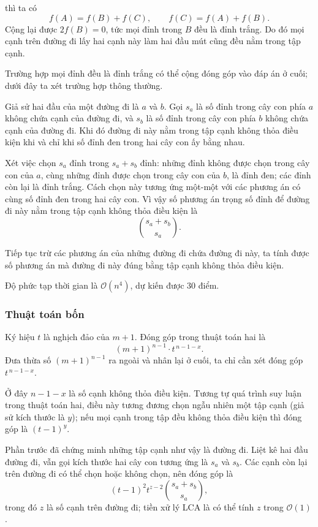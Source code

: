 \documentclass[11pt]{article}
\newcommand{\Oh}{\mathcal{O}}
\begin{document}
thì ta có
\[
  f(A)=f(B)+f(C),\qquad f(C)=f(A)+f(B).
\]
Cộng lại được \(2f(B)=0\), tức mọi đỉnh trong \(B\) đều là đỉnh trắng. Do đó
mọi cạnh trên đường đi lấy hai cạnh này làm hai đầu mút cũng đều nằm trong tập
cạnh.

Trường hợp mọi đỉnh đều là đỉnh trắng có thể cộng đóng góp vào đáp án ở cuối;
dưới đây ta xét trường hợp thông thường.

Giả sử hai đầu của một đường đi là \(a\) và \(b\). Gọi \(s_a\) là số đỉnh trong
cây con phía \(a\) không chứa cạnh của đường đi, và \(s_b\) là số đỉnh trong
cây con phía \(b\) không chứa cạnh của đường đi. Khi đó đường đi này nằm trong
tập cạnh không thỏa điều kiện khi và chỉ khi số đỉnh đen trong hai cây con ấy
bằng nhau.

Xét việc chọn \(s_a\) đỉnh trong \(s_a+s_b\) đỉnh: những đỉnh không được chọn
trong cây con của \(a\), cùng những đỉnh được chọn trong cây con của \(b\), là
đỉnh đen; các đỉnh còn lại là đỉnh trắng. Cách chọn này tương ứng một-một với
các phương án có cùng số đỉnh đen trong hai cây con. Vì vậy số phương án trọng
số đỉnh để đường đi này nằm trong tập cạnh không thỏa điều kiện là
\[
  \binom{s_a+s_b}{s_a}.
\]

Tiếp tục trừ các phương án của những đường đi chứa đường đi này, ta tính được
số phương án mà đường đi này đúng bằng tập cạnh không thỏa điều kiện.

Độ phức tạp thời gian là \(\Oh(n^4)\), dự kiến được \(30\) điểm.

\subsubsection{Thuật toán bốn}

Ký hiệu \(t\) là nghịch đảo của \(m+1\). Đóng góp trong thuật toán hai là
\[
  (m+1)^{n-1}\cdot t^{\,n-1-x}.
\]
Đưa thừa số \((m+1)^{n-1}\) ra ngoài và nhân lại ở cuối, ta chỉ cần xét đóng
góp \(t^{\,n-1-x}\).

Ở đây \(n-1-x\) là số cạnh không thỏa điều kiện. Tương tự quá trình suy luận
trong thuật toán hai, điều này tương đương chọn ngẫu nhiên một tập cạnh (giả sử
kích thước là \(y\)); nếu mọi cạnh trong tập đều không thỏa điều kiện thì đóng
góp là \((t-1)^y\).

Phần trước đã chứng minh những tập cạnh như vậy là đường đi. Liệt kê hai đầu
đường đi, vẫn gọi kích thước hai cây con tương ứng là \(s_a\) và \(s_b\). Các
cạnh còn lại trên đường đi có thể chọn hoặc không chọn, nên đóng góp là
\[
  (t-1)^2t^{z-2}\binom{s_a+s_b}{s_a},
\]
trong đó \(z\) là số cạnh trên đường đi; tiền xử lý LCA là có thể tính \(z\)
trong \(\Oh(1)\).
\end{document}
